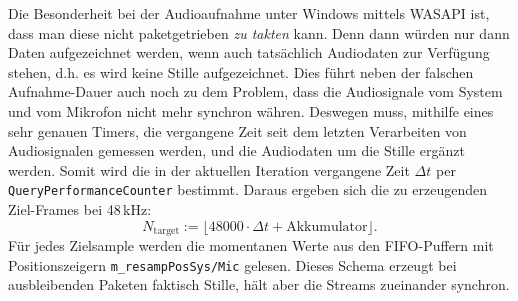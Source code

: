 Die Besonderheit bei der Audioaufnahme unter Windows mittels \ac{WASAPI} ist, dass man diese nicht paketgetrieben \emph{zu takten} kann. Denn dann würden nur dann Daten aufgezeichnet werden, wenn auch tatsächlich Audiodaten zur Verfügung stehen, d.h. es wird keine Stille aufgezeichnet. Dies führt neben der falschen Aufnahme-Dauer auch noch zu dem Problem, dass die Audiosignale vom System und vom Mikrofon nicht mehr synchron währen. Deswegen muss, mithilfe eines sehr genauen Timers, die vergangene Zeit seit dem letzten Verarbeiten von Audiosignalen gemessen werden, und die Audiodaten um die Stille ergänzt werden. Somit wird die in der aktuellen Iteration vergangene Zeit $\Delta t$ per \texttt{QueryPerformanceCounter} bestimmt. Daraus ergeben sich die zu erzeugenden Ziel-Frames bei 48\,kHz:
\[
N_\text{target} := \lfloor 48000 \cdot \Delta t + \text{Akkumulator} \rfloor.
\]
Für jedes Zielsample werden die momentanen Werte aus den FIFO-Puffern mit
Positionszeigern \texttt{m\_resampPosSys/Mic} gelesen. Dieses Schema erzeugt
bei ausbleibenden Paketen faktisch Stille, hält aber die Streams zueinander synchron.


